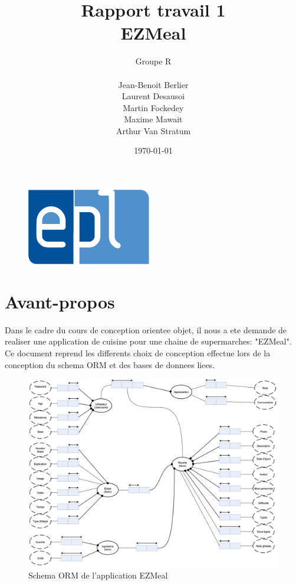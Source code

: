 \documentclass[a4paper,10pt]{report}
\title{Rapport travail 1 \\EZMeal}
\author{Groupe R\\ \\Jean-Benoit Berlier\\Laurent Desausoi \\ Martin Fockedey \\Maxime Mawait \\Arthur Van Stratum 
}
\date{\today}
\begin{document}
\begin{titlepage}
\begin{figure}[t]
\includegraphics[scale=0.3]{epl-logo.jpg}
\end{figure}

\maketitle 

\end{titlepage}

\tableofcontents

\pagebreak

\chapter{Avant-propos}

Dans le cadre du cours de conception orientee objet, il nous a ete demande de realiser une application de cuisine pour une chaine de supermarches: "EZMeal".
Ce document reprend les differents choix de conception effectue lors de la conception du schema ORM et des bases de donnees liees.

\begin{figure}[!h]
	\center
	\includegraphics[scale = 0.25]{SchemaORM.jpg}
	\caption{Schema ORM de l'application EZMeal}
	\label{ORM}
\end{figure}
\end{document}
